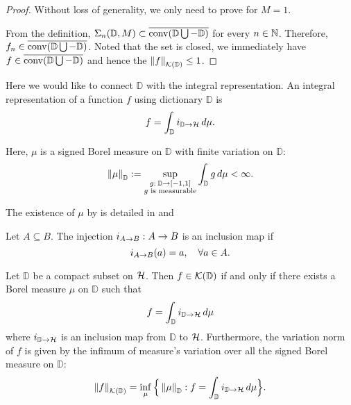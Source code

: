 \begin{proof}
    Without loss of generality, we only need to prove for $M = 1$.

    From the definition, $\Sigma_n(\mathbb{D}, M) \subset
    \overline{\operatorname*{conv}({\mathbb{D}} \bigcup -{\mathbb{D}})}$ for every $n \in \mathbb{N}$. Therefore, $f_n \in
    \overline{\operatorname*{conv}({\mathbb{D}} \bigcup -{\mathbb{D}})}$. Noted that the set is closed, we immediately
    have $f \in \overline{\operatorname*{conv}({\mathbb{D}} \bigcup -{\mathbb{D}})}$ and hence the
    $\left\| {f} \right\|_{\mathcal{K}({\mathbb{D}})} \leq 1$.
\end{proof}


Here we would like to connect $\mathbb{D}$ with the integral representation. An
integral representation of a function $f$ using dictionary $\mathbb{D}$ is
\begin{equation}
    f = \int_{\mathbb{D}} i_{{\mathbb{D}}\to{\mathcal{H}}} \,d\mu.
\end{equation}

Here, $\mu$ is a signed Borel measure on $\mathbb{D}$ with finite variation on $\mathbb{D}$:
\begin{equation}
    \label{eq:measure_set_variation}
    \left\| \mu \right\|_{\mathbb{D}} := \sup_{\substack{
            g: \:\mathbb{D} \to [-1, 1] \\ g \textnormal{ is measurable}
        }
    } \int_{\mathbb{D}} g\,d\mu < \infty.
\end{equation}

\begin{remark}
    The existence of $\mu$ by is detailed in \cite[Proposition
    2]{siegelCharacterizationVariationSpaces2022} and \citep[Chapter
    4]{diestelSequencesSeriesBanach1984}
\end{remark}

\begin{definition}
    \label{def:inclusionMap}
    Let $A \subseteq B$. The injection $i_{{A}\to{B}}: A\to B$ is an
    inclusion map if
    \begin{equation}
        i_{{A}\to{B}}(a) = a, \quad \forall a \in A.
    \end{equation}
\end{definition}

\begin{lemma}
    \label{lemma:compact_set_integral_representation}
    Let $\mathbb{D}$ be a compact subset on $\mathcal{H}$. Then $f \in
    \mathcal{K}({\mathbb{D}})$ if and only if there exists a Borel measure $\mu$ on
    $\mathbb{D}$ such that
    \begin{equation}
        f = \int_{\mathbb{D}} i_{{\mathbb{D}}\to{\mathcal{H}}} \,d\mu
    \end{equation}
    where $i_{{\mathbb{D}}\to{\mathcal{H}}}$ is an inclusion map from
    $\mathbb{D}$ to $\mathcal{H}$. Furthermore, the variation norm of $f$ is given
    by the infimum of measure's variation over all the signed Borel measure on
    $\mathbb{D}$:
    \begin{equation}
        \left\| {f} \right\|_{\mathcal{K}({\mathbb{D}})} = \inf_{\mu}\Big\{
            \left\| \mu \right\|_{\mathbb{D}}: 
            f = \int_{\mathbb{D}} i_{{\mathbb{D}}\to{\mathcal{H}}} \,d\mu
        \Big\}.
    \end{equation}
\end{lemma}

